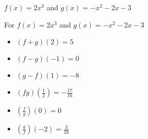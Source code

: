 {$f(x) = 2x^3$ and $g(x) = -x^2-2x-3$}
{For $f(x) = 2x^3$ and  $g(x) = -x^2-2x-3$

\begin{multicols}{2}
\begin{itemize}
\item  $(f+g)(2) = 5$
\item  $(f-g)(-1) = 0$
\item  $(g-f)(1) = -8$
\item  $(fg)\left(\frac{1}{2}\right) = -\frac{17}{16}$
\item  $\left(\frac{f}{g}\right)(0) = 0$
\item  $\left(\frac{g}{f}\right)\left(-2\right) = \frac{3}{16}$
\end{itemize}
\end{multicols}
}